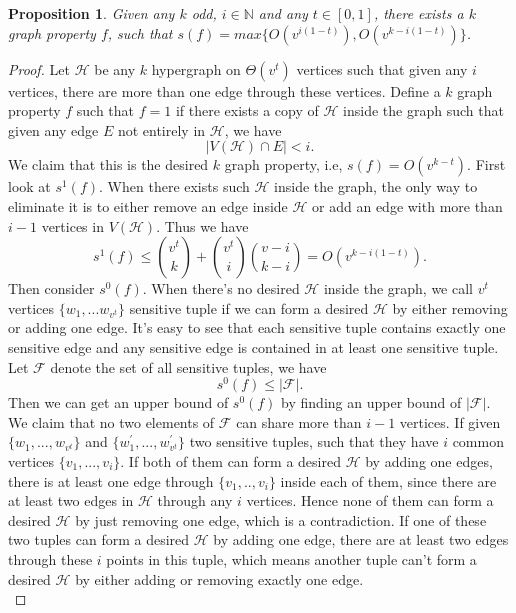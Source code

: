 \documentclass[psamsfonts]{amsart}
\newtheorem{prop}[theorem]{Proposition}
\theoremstyle{definition}
\theoremstyle{remark}
\numberwithin{equation}{section}
\begin{document}
	\begin{prop}
		Given any $k$ odd, $i \in \mathbb{N}$ and any $t \in [0,1]$, there exists a $k$ graph property $f$, such that $s(f) = max\{O(v^{i(1-t)}), O(v^{k-i(1-t)})\}$.
	\end{prop}
	\begin{proof}
		Let $\mathcal{H}$ be any $k$ hypergraph on $\Theta(v^t)$ vertices such that given any $i$ vertices, there are more than one edge through these vertices. Define a $k$ graph property $f$ such that $f=1$ if there exists a copy of $\mathcal{H}$ inside the graph such that given any edge $E$ not entirely in $\mathcal{H}$, we have
		\begin{equation}
			|V(\mathcal{H}) \cap E| < i.
		\end{equation}
		\indent We claim that this is the desired $k$ graph property, i.e, $s(f) = O(v^{k-t})$. First look at $s^1(f)$. When there exists such $\mathcal{H}$ inside the graph, the only way to eliminate it is to either remove an edge inside $\mathcal{H}$ or add an edge with more than $i-1$ vertices in $V(\mathcal{H})$. Thus we have
		\begin{equation}
			s^1(f) \leq {v^t \choose{k}} + {v^t \choose{i}}{v-i \choose{k-i}} = O(v^{k-i(1-t)}).
		\end{equation}
		Then consider $s^0(f)$. When there's no desired $\mathcal{H}$ inside the graph, we call $v^t$ vertices $\{w_1,...w_{v^t}\}$ sensitive tuple if we can form a desired $\mathcal{H}$ by either removing or adding one edge. It's easy to see that each sensitive tuple contains exactly one sensitive edge and any sensitive edge is contained in at least one sensitive tuple. Let $\mathcal{F}$ denote the set of all sensitive tuples, we have
		\begin{equation}
			s^0(f) \leq |\mathcal{F}|.
		\end{equation}
		Then we can get an upper bound of $s^0(f)$ by finding an upper bound of $|\mathcal{F}|$. We claim that no two elements of $\mathcal{F}$ can share more than $i-1$ vertices. If given $\{w_1,...,w_{v^t}\}$ and $\{w_1^\prime,...,w_{v^t}^\prime\}$ two sensitive tuples, such that they have $i$ common vertices $\{v_1,...,v_i\}$. If both of them can form a desired $\mathcal{H}$ by adding one edges, there is at least one edge through $\{v_1,..,v_i\}$ inside each of them, since there are at least two edges in $\mathcal{H}$ through any $i$ vertices. Hence none of them can form a desired $\mathcal{H}$ by just removing one edge, which is a contradiction. If one of these two tuples can form a desired $\mathcal{H}$ by adding one edge, there are at least two edges through these $i$ points in this tuple, which means another tuple can't form a desired $\mathcal{H}$ by either adding or removing exactly one edge.\\

\end{proof}
\end{document}
